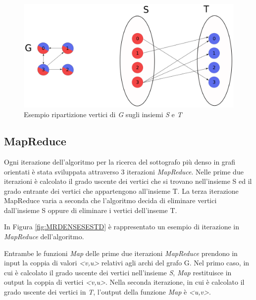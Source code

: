 \documentclass[LaM,binding=0.6cm]{sapthesis}
\begin{document}
\begin{figure}
\centering
 \includegraphics[width=1\textwidth]{denesestD}
\caption{Esempio ripartizione vertici di \textit{G} sugli insiemi\textit{ S} e \textit{T} }
\label{fig:DENSESET}
\end{figure}

\begin{minipage}{\linewidth}

\end{minipage}

\subsection{MapReduce}

Ogni iterazione dell'algoritmo per la ricerca del sottografo più denso in grafi orientati è stata sviluppata attraverso 3 iterazioni \textit{MapReduce}. Nelle prime due iterazioni è calcolato il grado uscente dei vertici che si trovano nell'insieme S ed il grado entrante dei vertici che appartengono all'insieme T. La terza iterazione MapReduce varia a seconda che l'algoritmo decida di eliminare vertici dall'insieme S oppure di eliminare i  vertici dell'inseme T.

In Figura \ref{fig:MRDENSESESTD} è rappresentato un esempio di iterazione in \textit{MapReduce} dell'algoritmo.

Entrambe le funzioni \textit{Map}  delle prime due iterazioni \textit{MapReduce} prendono in input la coppia di valori \textit{<v,u>} relativi agli archi del grafo G. Nel primo caso, in cui è calcolato il grado uscente dei vertici nell'insieme \textit{S}, \textit{Map} restituisce in output la coppia di vertici \textit{<v,u>}. Nella seconda iterazione, in cui è calcolato il grado uscente dei vertici in \textit{T}, l'output della funzione \textit{Map} è \textit{<u,v>}.
\end{document}
